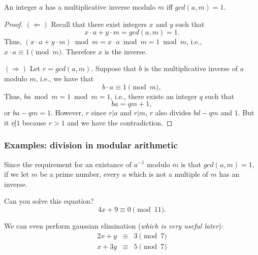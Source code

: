 \begin{frame}
  \begin{theorem}
    An integer $a$ has a multiplicative inverse modulo $m$ iff
    $gcd(a,m) = 1$.
  \end{theorem}
  \begin{proof}
    \pause
    {\footnotesize
    $(\Leftarrow)$ Recall that there exist integers $x$ and $y$ such
    that
    \[
    x\cdot a + y\cdot m = gcd(a,m) = 1.
    \]
    Thus,
    $(x\cdot a + y\cdot m)\bmod m = x\cdot a \bmod m = 1 \bmod m$,
    i.e., $x\cdot a\equiv 1 \pmod m$.  Therefore $x$ is the inverse.

    \pause
    $(\Rightarrow)$ Let $r=gcd(a,m)$.
    Suppose that $b$ is the multiplicative inverse of
    $a$ modulo $m$, i.e., we have that
    \[
    b\cdot a \equiv 1 \pmod m,
    \]
    Thus, $ba \bmod m = 1 \bmod m = 1$, i.e., there exists an integer
    $q$ such that
    \[
    ba = qm + 1,
    \]
    or $ba - qm = 1$.  However, $r$ since $r|a$ and $r|m$, $r$ also
    divides $bd-qm$ and $1$.  But it $r\not|1$ because $r>1$ and we
    have the contradiction.
    }
  \end{proof}
\end{frame}

\begin{frame}
  \frametitle{Examples: division in modular arithmetic}

  Since the requirement for an existance of $a^{-1}$ modulo $m$ is
  that $gcd(a,m)=1$, if we let $m$ be a prime number, every $a$ which
  is not a multiple of $m$ has an inverse.

  Can you solve this equation?
  \[
  4x + 9 \equiv 0 \pmod{11}.
  \]

  \pause

  We can even perform gaussian elimination ({\em which is very useful
    later}):
  \[
  \begin{array}{rcl}
    2x + y & \equiv & 3 \pmod 7 \\
    x + 3y & \equiv & 5 \pmod 7
  \end{array}
  \]
  
\end{frame}

